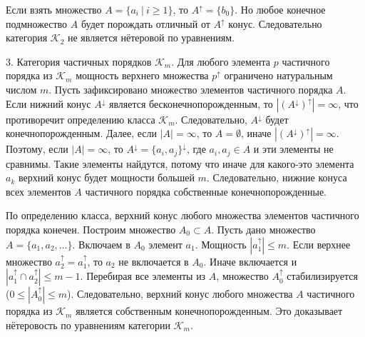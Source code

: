 \documentclass[12pt]{article}
\theoremstyle{break}
\def\K{\mathcal{K}_m}
\begin{document}
		Если взять множество $A = \{a_i~|~i\geqslant 1\}$, то $A^{\uparrow} = \{b_0\}$. Но любое конечное подмножество $A$ будет порождать отличный от $A^{\uparrow}$ конус. Следовательно категория $\mathcal{K}_2$ не является нётеровой по уравнениям.

		3. Категория частичных порядков $\K$. Для любого элемента $p$ частичного порядка из $\K$ мощность верхнего множества $p^{\uparrow}$ ограничено натуральным числом $m$. Пусть зафиксировано множество элементов частичного порядка $A$. Если нижний конус $A^{\downarrow}$ является бесконечнопорожденным, то $|(A^{\downarrow})^{\uparrow}| = \infty$, что противоречит определению класса $\K$. Следовательно, $A^{\downarrow}$ будет конечнопорожденным. Далее, если $|A| = \infty$, то $A = \emptyset$, иначе $|(A^{\downarrow})^{\uparrow}| = \infty$. Поэтому, если $|A|=\infty$, то $A^{\downarrow} = \{a_i, a_j\}^{\downarrow}$, где $a_i, a_j\in A$ и эти элементы не сравнимы. Такие элементы найдутся, потому что иначе для какого-это элемента $a_k$ верхний конус будет мощности большей $m$. Следовательно, нижние конуса всех элементов $A$ частичного порядка собственные конечнопорожденные.

		По определению класса, верхний конус любого множества элементов частичного порядка конечен. Построим множество $A_0\subset A$. Пусть дано множество $A = \{a_1, a_2,\dots\}.$ Включаем в $A_0$ элемент $a_1$. Мощность $|a_1^{\uparrow}| \leqslant m.$ Если верхнее множество $a_2^{\uparrow} = a_1^{\uparrow}$, то $a_2$ не включается в $A_0$. Иначе включается и $|a_1^{\uparrow} \cap a_2^{\uparrow}| \leqslant m-1$. Перебирая все элементы из $A$, множество $A_0^{\uparrow}$ стабилизируется ($0 \leqslant |A_0^{\uparrow}| \leqslant m$). Следовательно, верхний конус любого множества $A$ частичного порядка из $\K$ является собственным конечнопорожденным. Это доказывает нётеровость по уравнениям категории $\K$.
	
\end{document}
